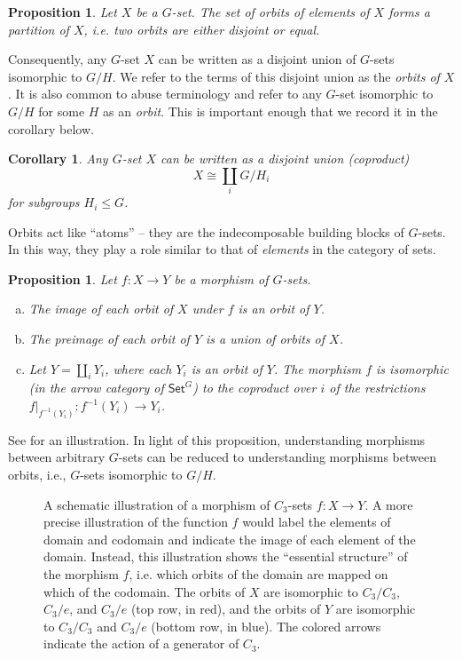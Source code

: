 \documentclass{amsart}
\newcommand{\Set}{\mathsf{Set}}
\newcommand{\GSet}{\Set^G}
\numberwithin{equation}{section}
\newtheorem{proposition}[equation]{Proposition}
\newtheorem{corollary}[equation]{Corollary}
\theoremstyle{definition}
\begin{document}
\begin{proposition}
	Let $X$ be a $G$-set. The set of orbits of elements of $X$ forms a partition of $X$, i.e. two orbits are either disjoint or equal.
\end{proposition}

Consequently, any $G$-set $X$ can be written as a disjoint union of $G$-sets isomorphic to $G/H$. We refer to the terms of this disjoint union as the \emph{orbits of $X$}. It is also common to abuse terminology and refer to any $G$-set isomorphic to $G/H$ for some $H$ as an \emph{orbit}. This is important enough that we record it in the corollary below.

\begin{corollary}
	\label{G-sets are disjoint unions of coset spaces}
	Any $G$-set $X$ can be written as a disjoint union (coproduct)
	\[
		X \cong \coprod_i G/H_i
	\]
	for subgroups $H_i \leq G$.
\end{corollary}

	Orbits act like ``atoms'' -- they are the indecomposable building blocks of $G$-sets. In this way, they play a role similar to that of \emph{elements} in the category of sets.

\begin{proposition}
	\label{orbits to orbits}
	Let $f \colon X \to Y$ be a morphism of $G$-sets.
	\begin{enumerate}[(a)]
		\item The image of each orbit of $X$ under $f$ is an orbit of $Y$.
		\item The preimage of each orbit of $Y$ is a union of orbits of $X$.
		\item Let $Y = \coprod_i Y_i$, where each $Y_i$ is an orbit of $Y$. The morphism $f$ is isomorphic (in the arrow category of $\GSet$) to the coproduct over $i$ of the restrictions $f|_{f^{-1}(Y_i)} \colon f^{-1}(Y_i) \to Y_i$.
	\end{enumerate}
\end{proposition}

See  for an illustration. In light of this proposition, understanding morphisms between arbitrary $G$-sets can be reduced to understanding morphisms between orbits, i.e., $G$-sets isomorphic to $G/H$.

\begin{figure}[h]
	\begin{center}
		
	\end{center}
	\caption{A schematic illustration of a morphism of $C_3$-sets $f \colon X \to Y$. A more precise illustration of the function $f$ would label the elements of domain and codomain and indicate the image of each element of the domain. Instead, this illustration shows the ``essential structure'' of the morphism $f$, i.e. which orbits of the domain are mapped on which of the codomain. The orbits of $X$ are isomorphic to $C_3/C_3$, $C_3/e$, and $C_3/e$ (top row, in red), and the orbits of $Y$ are isomorphic to $C_3/C_3$ and $C_3/e$ (bottom row, in blue). The colored arrows indicate the action of a generator of $C_3$.}
	\label{morphism of C3 sets}
\end{figure}
\end{document}

